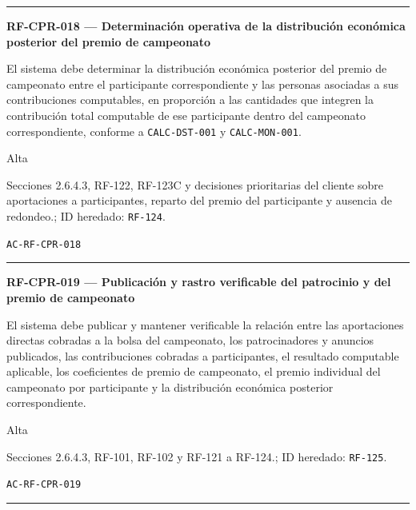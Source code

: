 \documentclass[10pt,letterpaper]{article}
\begin{document}
\vspace{0.25em}\hrule\vspace{0.65em}
\noindent\textbf{RF-CPR-018 --- Determinación operativa de la distribución económica posterior del premio de campeonato}\par
\begin{description}[style=nextline,leftmargin=3.15cm,labelwidth=2.8cm,font=\normalfont\bfseries]
\item[Obligación] El sistema debe determinar la distribución económica posterior del premio de campeonato entre el participante correspondiente y las personas asociadas a sus contribuciones computables, en proporción a las cantidades que integren la contribución total computable de ese participante dentro del campeonato correspondiente, conforme a \texttt{CALC-DST-001} y \texttt{CALC-MON-001}.
\item[Prioridad] Alta
\item[Procedencia] Secciones 2.6.4.3, RF-122, RF-123C y decisiones prioritarias del cliente sobre aportaciones a participantes, reparto del premio del participante y ausencia de redondeo.; ID heredado: \texttt{RF-124}.
\item[Verificación] \texttt{AC-RF-CPR-018}
\end{description}
\vspace{0.25em}\hrule\vspace{0.65em}
\noindent\textbf{RF-CPR-019 --- Publicación y rastro verificable del patrocinio y del premio de campeonato}\par
\begin{description}[style=nextline,leftmargin=3.15cm,labelwidth=2.8cm,font=\normalfont\bfseries]
\item[Obligación] El sistema debe publicar y mantener verificable la relación entre las aportaciones directas cobradas a la bolsa del campeonato, los patrocinadores y anuncios publicados, las contribuciones cobradas a participantes, el resultado computable aplicable, los coeficientes de premio de campeonato, el premio individual del campeonato por participante y la distribución económica posterior correspondiente.
\item[Prioridad] Alta
\item[Procedencia] Secciones 2.6.4.3, RF-101, RF-102 y RF-121 a RF-124.; ID heredado: \texttt{RF-125}.
\item[Verificación] \texttt{AC-RF-CPR-019}
\end{description}
\vspace{0.25em}\hrule\vspace{0.65em}
\end{document}
